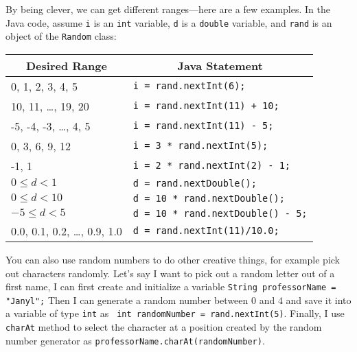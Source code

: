 By being clever, we can get different ranges---here are a few
examples. In the Java code, assume {\tt i} is an {\tt int} variable,
{\tt d} is a {\tt double} variable, and {\tt rand} is an object of the
{\tt Random} class:
\begin{center}
\begin{tabular}{p{2.5in}p{3.5in}}
\multicolumn{1}{c}{\bf Desired Range} & \multicolumn{1}{c}{\bf Java
Statement}\\\hline
0, 1, 2, 3, 4, 5 & \verb$i = rand.nextInt(6);$\\
10, 11, \ldots, 19, 20 & \verb$i = rand.nextInt(11) + 10;$\\
-5, -4, -3, \ldots, 4, 5 & \verb$i = rand.nextInt(11) - 5;$\\
0, 3, 6, 9, 12 & \verb$i = 3 * rand.nextInt(5);$\\
-1, 1 & \verb$i = 2 * rand.nextInt(2) - 1;$\\
$0 \leq d < 1$ & \verb$d = rand.nextDouble();$\\
$0 \leq d < 10$ & \verb$d = 10 * rand.nextDouble();$\\
$-5 \leq d < 5$ & \verb$d = 10 * rand.nextDouble() - 5;$\\
0.0, 0.1, 0.2, \ldots, 0.9, 1.0 & \verb$d = rand.nextInt(11)/10.0;$
\end{tabular}
\end{center}

You can also use random numbers to do other creative things, for example pick out characters randomly. Let's say I want
to pick out a random letter out of a first name, I can first create and initialize a variable {\tt{String professorName =
"Janyl";}} Then I can generate a random number between $0$ and $4$ and save it into a variable of type {\tt int} as
{\tt{ int randomNumber = rand.nextInt(5)}}. Finally, I  use {\tt{charAt}} method to select the character at a position
created by the random number generator as {\tt{professorName.charAt(randomNumber)}}.


